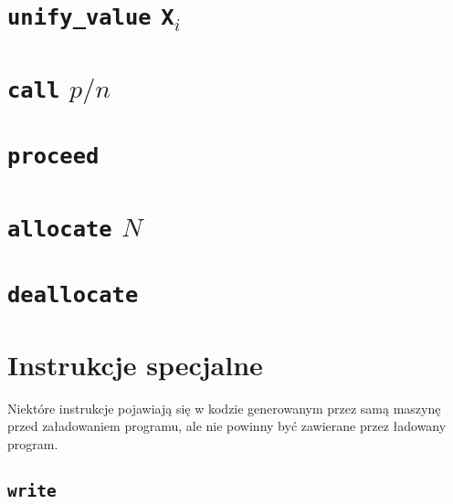 \section{\texttt{unify\_value} \texttt{X}$_i$}

\section{\texttt{call} $p/n$}

\section{\texttt{proceed}}

\section{\texttt{allocate} $N$}

\section{\texttt{deallocate}}

\section{Instrukcje specjalne}

Niektóre instrukcje pojawiają się w kodzie generowanym przez samą maszynę przed załadowaniem programu, ale nie powinny być zawierane przez ładowany program.

\subsection{\texttt{write}}